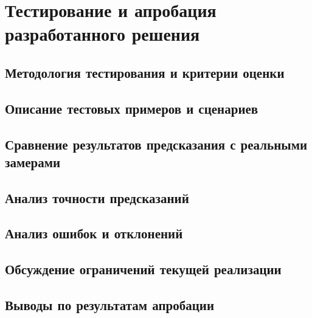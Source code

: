 \section{Тестирование и апробация разработанного решения}

\subsection{Методология тестирования и критерии оценки}

\subsection{Описание тестовых примеров и сценариев}

\subsection{Сравнение результатов предсказания с реальными замерами}

\subsection{Анализ точности предсказаний}

\subsection{Анализ ошибок и отклонений}

\subsection{Обсуждение ограничений текущей реализации}

\subsection{Выводы по результатам апробации}
